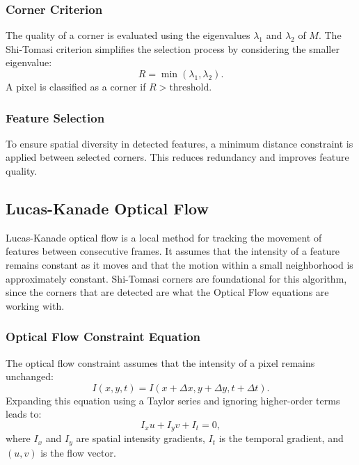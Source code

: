 \documentclass[11pt, conference, letterpaper]{IEEEtran}
\begin{document}
\bigskip


\subsubsection{Corner Criterion}
The quality of a corner is evaluated using the eigenvalues \(\lambda_1\) and \(\lambda_2\) of \(M\). The Shi-Tomasi criterion simplifies the selection process by considering the smaller eigenvalue:
\begin{equation}
R = \min(\lambda_1, \lambda_2).
\end{equation}
A pixel is classified as a corner if \(R > \text{threshold}\).
\bigskip

\subsubsection{Feature Selection}
To ensure spatial diversity in detected features, a minimum distance constraint is applied between selected corners. This reduces redundancy and improves feature quality.
\bigskip


\subsection{Lucas-Kanade Optical Flow}
Lucas-Kanade optical flow is a local method for tracking the movement of features between consecutive frames. It assumes that the intensity of a feature remains constant as it moves and that the motion within a small neighborhood is approximately constant. Shi-Tomasi corners are foundational for this algorithm, since the corners that are detected are what the Optical Flow equations are working with.

\subsubsection{Optical Flow Constraint Equation}
The optical flow constraint assumes that the intensity of a pixel remains unchanged:
\begin{equation}
I(x, y, t) = I(x + \Delta x, y + \Delta y, t + \Delta t).
\end{equation}
Expanding this equation using a Taylor series and ignoring higher-order terms leads to:
\begin{equation}
I_x u + I_y v + I_t = 0,
\end{equation}
where \(I_x\) and \(I_y\) are spatial intensity gradients, \(I_t\) is the temporal gradient, and \((u, v)\) is the flow vector.
\bigskip
\end{document}
